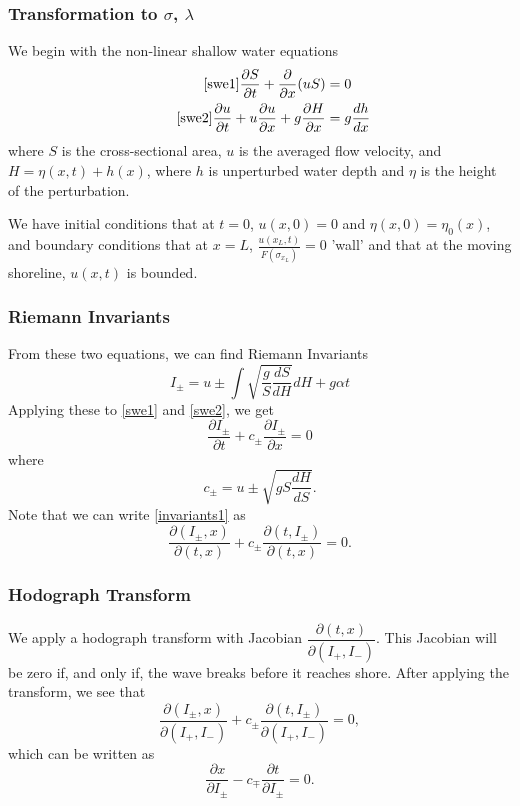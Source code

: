 	\begin{frame}
		\frametitle{Transformation to $\sigma$, $\lambda$}
		We begin with the non-linear shallow water equations
		\begin{align} 
			\tag*{\eqref{swe1}}
			\frac{\partial S}{\partial t} + \frac{\partial}{\partial x} (uS) &= 0  \\
			\tag*{\eqref{swe2}}
			\frac{\partial u}{\partial t} + u \frac{\partial u}{\partial x} + g \frac{\partial H}{\partial x} &= g \frac{dh}{dx}
		\end{align}
		where $S$ is the cross-sectional area, $u$ is the averaged flow velocity, and $H = \eta(x,t) + h(x)$, where $h$ is unperturbed water depth and $\eta$ is the height of the perturbation.
		
		We have initial conditions that at $t=0$, $u(x,0) = 0$ and $\eta(x,0) = \eta_0(x)$, and boundary conditions that at $x=L$, $\frac{u(x_L,t)}{F(\sigma_{x_L})}=0$ 'wall' and that at the moving shoreline, $u(x,t)$ is bounded.
		
	\end{frame}


\begin{frame}
\frametitle{Riemann Invariants}
From these two equations, we can find Riemann Invariants
\[
I_\pm = u \pm \int \sqrt{\frac{g}{S}\frac{dS}{dH}} dH + g \alpha t
\]
Applying these to \eqref{swe1} and \eqref{swe2}, we get
\begin{equation}\label{invariants1}
\frac{\partial I_\pm}{\partial t} + c_{\pm} \frac{\partial I_\pm}{\partial x} = 0
\end{equation}
where
\[
c_\pm = u \pm \sqrt{g S \frac{dH}{dS}}.
\]
Note that we can write \eqref{invariants1} as
\[
\frac{\partial (I_\pm, x)}{\partial (t,x)} + c_\pm \frac{\partial(t, I_\pm)}{\partial (t,x)} = 0.
\]
\end{frame}

\begin{frame}
\frametitle{Hodograph Transform}
We apply a hodograph transform with Jacobian $\dfrac{\partial (t,x)}{\partial(I_+, I_-)}$. This Jacobian will be zero if, and only if, the wave breaks before it reaches shore. After applying the transform, we see that
\[
\frac{\partial(I_\pm,x)}{\partial(I_+,I_-)} + c_\pm \frac{\partial (t, I_\pm)}{\partial(I_+,I_-)} = 0,
\]
which can be written as
\begin{equation}\label{hodograph}
\frac{\partial x}{\partial I_\pm} - c_\mp \frac{\partial t}{\partial I_\pm} = 0.
\end{equation}
\end{frame}

